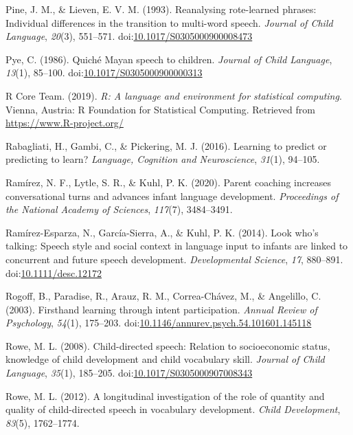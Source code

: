 \documentclass[,man,floatsintext]{apa6}
\begin{document}
\hypertarget{ref-pine1993reanalysing}{}
Pine, J. M., \& Lieven, E. V. M. (1993). Reanalysing rote-learned
phrases: Individual differences in the transition to multi-word speech.
\emph{Journal of Child Language}, \emph{20}(3), 551--571.
doi:\href{https://doi.org/10.1017/S0305000900008473}{10.1017/S0305000900008473}

\hypertarget{ref-pye1986quiche}{}
Pye, C. (1986). Quiché Mayan speech to children. \emph{Journal of Child
Language}, \emph{13}(1), 85--100.
doi:\href{https://doi.org/10.1017/S0305000900000313}{10.1017/S0305000900000313}

\hypertarget{ref-R-base}{}
R Core Team. (2019). \emph{R: A language and environment for statistical
computing}. Vienna, Austria: R Foundation for Statistical Computing.
Retrieved from \url{https://www.R-project.org/}

\hypertarget{ref-rabagliati2016learning}{}
Rabagliati, H., Gambi, C., \& Pickering, M. J. (2016). Learning to
predict or predicting to learn? \emph{Language, Cognition and
Neuroscience}, \emph{31}(1), 94--105.

\hypertarget{ref-ramirez2020parent}{}
Ramírez, N. F., Lytle, S. R., \& Kuhl, P. K. (2020). Parent coaching
increases conversational turns and advances infant language development.
\emph{Proceedings of the National Academy of Sciences}, \emph{117}(7),
3484--3491.

\hypertarget{ref-ramirezesparza2014look}{}
Ramírez-Esparza, N., García-Sierra, A., \& Kuhl, P. K. (2014). Look
who's talking: Speech style and social context in language input to
infants are linked to concurrent and future speech development.
\emph{Developmental Science}, \emph{17}, 880--891.
doi:\href{https://doi.org/10.1111/desc.12172}{10.1111/desc.12172}

\hypertarget{ref-rogoff2003firsthand}{}
Rogoff, B., Paradise, R., Arauz, R. M., Correa-Chávez, M., \& Angelillo,
C. (2003). Firsthand learning through intent participation. \emph{Annual
Review of Psychology}, \emph{54}(1), 175--203.
doi:\href{https://doi.org/10.1146/annurev.psych.54.101601.145118}{10.1146/annurev.psych.54.101601.145118}

\hypertarget{ref-rowe2008child}{}
Rowe, M. L. (2008). Child-directed speech: Relation to socioeconomic
status, knowledge of child development and child vocabulary skill.
\emph{Journal of Child Language}, \emph{35}(1), 185--205.
doi:\href{https://doi.org/10.1017/S0305000907008343}{10.1017/S0305000907008343}

\hypertarget{ref-rowe2012longitudinal}{}
Rowe, M. L. (2012). A longitudinal investigation of the role of quantity
and quality of child-directed speech in vocabulary development.
\emph{Child Development}, \emph{83}(5), 1762--1774.
\end{document}
